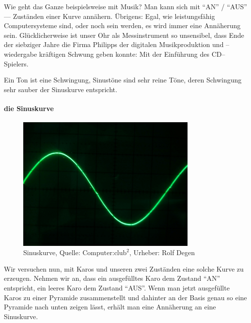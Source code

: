   Wie geht das Ganze beispielsweise mit Musik? Man kann sich mit ``AN'' / ``AUS'' --- Zuständen einer Kurve annähern. Übrigens: Egal, wie leistungsfähig Computersysteme sind, oder noch sein werden, es wird immer eine Annäherung sein. Glücklicherweise ist unser Ohr als Messinstrument so unsensibel, dass Ende der siebziger Jahre die Firma Philipps der digitalen Musikproduktion und --wiedergabe kräftigen Schwung geben konnte: Mit der Einführung des CD--Spielers.

  Ein Ton ist eine Schwingung, Sinustöne sind sehr reine Töne, deren Schwingung sehr sauber der Sinuskurve entspricht. 

  \begin{frame}
  \framesubtitle{die Sinuskurve}
    \begin{figure}
      \begin{center}  
        \includegraphics[width=0.8\textwidth]{pics/sinus-kurve}
      \end{center}
      \caption{Sinuskurve, Quelle: $\text{Computer:club}^2$, Urheber: Rolf Degen}
    \end{figure}
  \end{frame}

  Wir versuchen nun, mit Karos und unseren zwei Zuständen eine solche Kurve zu erzeugen. Nehmen wir an, dass ein ausgefülltes Karo dem Zustand ``AN'' entspricht, ein leeres Karo dem Zustand ``AUS''. Wenn man jetzt ausgefüllte Karos zu einer Pyramide zusammenstellt und dahinter an der Basis genau so eine Pyramide nach unten zeigen lässt, erhält man eine Annäherung an eine Sinuskurve. 


